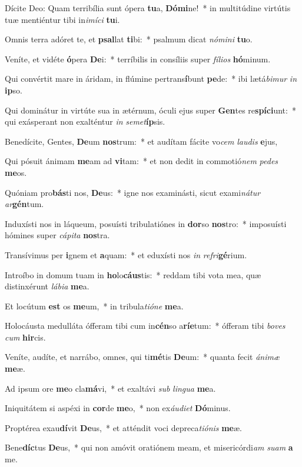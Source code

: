 \item Dícite Deo: Quam terribília sunt ópera \textbf{tu}a, \textbf{Dó}\textbf{mi}ne!~* in multitúdine virtútis tuæ mentiéntur tibi in\textit{i}\textit{mí}\textit{ci} \textbf{tu}i.
\item Omnis terra adóret te, et \textbf{psal}lat \textbf{ti}bi:~* psalmum dicat \textit{nó}\textit{mi}\textit{ni} \textbf{tu}o.
\item Veníte, et vidéte \textbf{ó}pera \textbf{De}i:~* terríbilis in consíliis super \textit{fí}\textit{li}\textit{os} \textbf{hó}minum.
\item Qui convértit mare in áridam, in flúmine pertrans\textbf{í}bunt \textbf{pe}de:~* ibi lætá\textit{bi}\textit{mur} \textit{in} \textbf{ip}so.
\item Qui dominátur in virtúte sua in ætérnum, óculi ejus super \textbf{Gen}tes re\textbf{spí}\textbf{ci}unt:~* qui exásperant non exalténtur \textit{in} \textit{se}\textit{met}\textbf{íp}sis.
\item Benedícite, Gentes, \textbf{De}um \textbf{nos}trum:~* et audítam fácite vo\textit{cem} \textit{lau}\textit{dis} \textbf{e}jus,
\item Qui pósuit ánimam \textbf{me}am ad \textbf{vi}tam:~* et non dedit in commotió\textit{nem} \textit{pe}\textit{des} \textbf{me}os.
\item Quóniam pro\textbf{bás}ti nos, \textbf{De}us:~* igne nos examinásti, sicut exami\textit{ná}\textit{tur} \textit{ar}\textbf{gén}tum.
\item Induxísti nos in láqueum, posuísti tribulatiónes in \textbf{dor}so \textbf{nos}tro:~* imposuísti hómines super \textit{cá}\textit{pi}\textit{ta} \textbf{nos}tra.
\item Transívimus per \textbf{i}gnem et \textbf{a}quam:~* et eduxísti nos \textit{in} \textit{re}\textit{fri}\textbf{gé}rium.
\item Introíbo in domum tuam in \textbf{ho}lo\textbf{cáus}tis:~* reddam tibi vota mea, quæ distinxérunt \textit{lá}\textit{bi}\textit{a} \textbf{me}a.
\item Et locútum \textbf{est} os \textbf{me}um,~* in tribula\textit{ti}\textit{ó}\textit{ne} \textbf{me}a.
\item Holocáusta medulláta ófferam tibi cum in\textbf{cén}so a\textbf{rí}\textbf{e}tum:~* ófferam tibi \textit{bo}\textit{ves} \textit{cum} \textbf{hir}cis.
\item Veníte, audíte, et narrábo, omnes, qui ti\textbf{mé}tis \textbf{De}um:~* quanta fecit \textit{á}\textit{ni}\textit{mæ} \textbf{me}æ.
\item Ad ipsum ore \textbf{me}o cla\textbf{má}vi,~* et exaltávi \textit{sub} \textit{lin}\textit{gua} \textbf{me}a.
\item Iniquitátem si aspéxi in \textbf{cor}de \textbf{me}o,~* non ex\textit{áu}\textit{di}\textit{et} \textbf{Dó}minus.
\item Proptérea exau\textbf{dí}vit \textbf{De}us,~* et atténdit voci depreca\textit{ti}\textit{ó}\textit{nis} \textbf{me}æ.
\item Bene\textbf{díc}tus \textbf{De}us,~* qui non amóvit oratiónem meam, et misericórdi\textit{am} \textit{su}\textit{am} \textbf{a} me.
